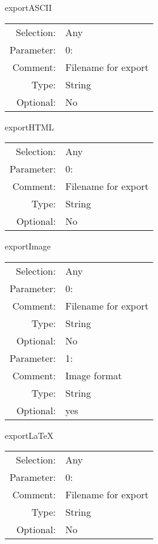 \item exportASCII\\
\begin{tabular}{rl}
  Selection: & Any\\
   Parameter: &  0:\\
        Comment: & Filename for export\\
           Type: & String\\
       Optional: &  No\\
\end{tabular}

\item exportHTML\\
\begin{tabular}{rl}
  Selection: & Any\\
   Parameter: &  0:\\
        Comment: & Filename for export\\
           Type: & String\\
       Optional: &  No\\
\end{tabular}

\item exportImage\\
\begin{tabular}{rl}
  Selection: & Any\\
   Parameter: &  0:\\
        Comment: & Filename for export\\
           Type: & String\\
       Optional: &  No\\
   Parameter: &  1:\\
        Comment: & Image format\\
           Type: & String\\
       Optional: &  yes\\
\end{tabular}

\item exportLaTeX\\
\begin{tabular}{rl}
  Selection: & Any\\
   Parameter: &  0:\\
        Comment: & Filename for export\\
           Type: & String\\
       Optional: &  No\\
\end{tabular}

